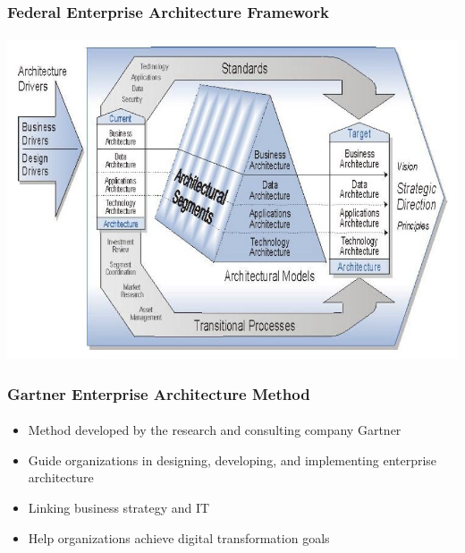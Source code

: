 \documentclass[aspectratio=169, table]{beamer}
\begin{document}
    {
        \begin{frame}
            \frametitle{Federal Enterprise Architecture Framework}
            \framesubtitle{\hspace{1cm}}
            \begin{center}
                \includegraphics[width=.75\textwidth]{../figures/feaf}
            \end{center}
        \end{frame}
    }

    \begin{frame}
        \frametitle{Gartner Enterprise Architecture Method}
        \framesubtitle{\hspace{1cm}}
        \begin{itemize}
            \item Method developed by the research and consulting company Gartner
            \item Guide organizations in designing, developing, and implementing enterprise architecture
            \item Linking business strategy and IT
            \item Help organizations achieve digital transformation goals
        \end{itemize}
    \end{frame}
\end{document}
